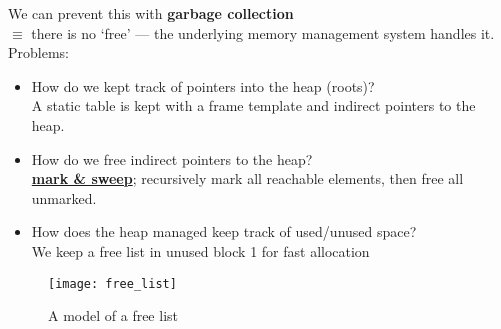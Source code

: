 \documentclass[../../lecture_notes.tex]{subfiles}
\begin{document}
\noindent We can prevent this with \textbf{{garbage collection}}\\
	\indent $\equiv$ there is no ‘free’ — the underlying memory management system handles it.\\
	\indent Problems:
		\begin{itemize} [itemsep=0mm]
			\item How do we kept track of pointers into the heap (roots)?\\
				A static table is kept with a frame template and indirect pointers to the heap.
			\item How do we free indirect pointers to the heap?\\
				\textbf{\underline{mark \& sweep}}; 
					recursively mark all reachable elements, then free all unmarked.
			\item How does the heap managed keep track of used/unused space?\\
				We keep a free list in unused block 1 for fast allocation
		\end{itemize}

\begin{figure}[H]
	\centering
	\texttt{[image: free\_list]}
	\caption{A model of a free list}
	\label{fig:test}
\end{figure}
\end{document}
